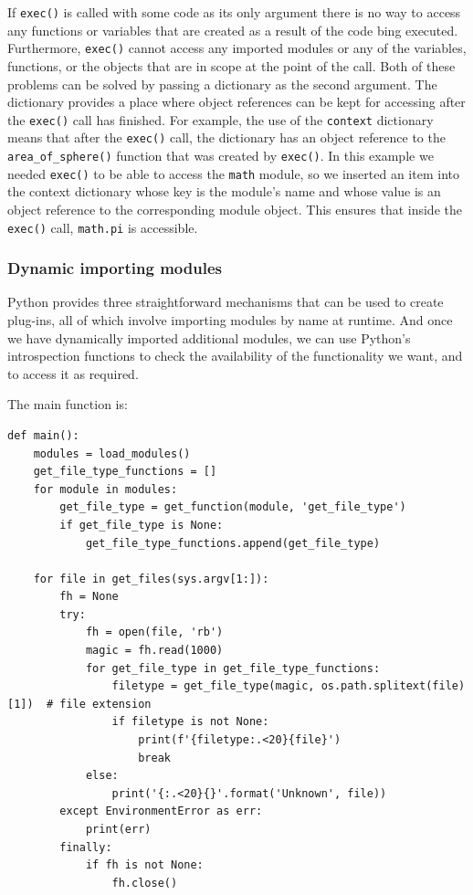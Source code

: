 If \verb|exec()| is called with some code as its only argument there is no way to access any functions or variables
that are created as a result of the code bing executed.
Furthermore, \verb|exec()| cannot access any imported modules or any of the variables, functions, or the objects
that are in scope at the point of the call.
Both of these problems can be solved by passing a dictionary as the second argument.
The dictionary provides a place where object references can be kept for accessing after the \verb|exec()| call has finished.
For example, the use of the \verb|context| dictionary means that
after the \verb|exec()| call,
the dictionary has an object reference to the \verb|area_of_sphere()| function that was created by \verb|exec()|.
In this example we needed \verb|exec()| to be able to access the \verb|math| module,
so we inserted an item into the context dictionary whose key is the module’s name and
whose value is an object reference to the corresponding module object.
This ensures that inside the \verb|exec()| call, \verb|math.pi| is accessible.



\subsubsection{Dynamic importing modules}

Python provides three straightforward mechanisms that can be used to create plug-ins,
all of which involve importing modules by name at runtime.
And once we have dynamically imported additional modules,
we can use Python’s introspection functions to check the availability of the functionality we want,
and to access it as required.


The main function is:
\begin{lstlisting}
def main():
    modules = load_modules()
    get_file_type_functions = []
    for module in modules:
        get_file_type = get_function(module, 'get_file_type')
        if get_file_type is None:
            get_file_type_functions.append(get_file_type)

    for file in get_files(sys.argv[1:]):
        fh = None
        try:
            fh = open(file, 'rb')
            magic = fh.read(1000)
            for get_file_type in get_file_type_functions:
                filetype = get_file_type(magic, os.path.splitext(file)[1])  # file extension
                if filetype is not None:
                    print(f'{filetype:.<20}{file}')
                    break
            else:
                print('{:.<20}{}'.format('Unknown', file))
        except EnvironmentError as err:
            print(err)
        finally:
            if fh is not None:
                fh.close()  
\end{lstlisting}


